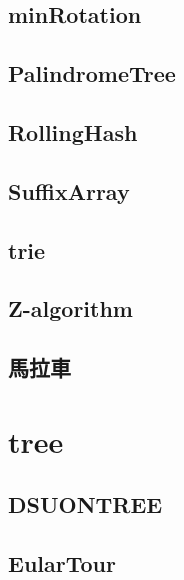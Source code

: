 \documentclass[a4paper,10pt,twocolumn,oneside]{article}
\begin{document}
    \subsection{minRotation}
    

    \subsection{PalindromeTree}
    

    \subsection{RollingHash}
    

    \subsection{SuffixArray}
    

    \subsection{trie}
    

    \subsection{Z-algorithm}
    

    \subsection{馬拉車}
    

\section{tree}
    \subsection{DSUONTREE}
    

    \subsection{EularTour}
    
\end{document}
